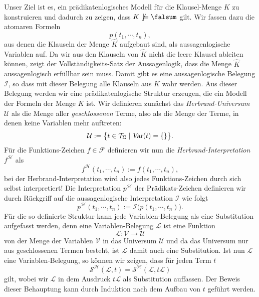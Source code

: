 Unser Ziel ist es, ein pr\"{a}dikatenlogisches Modell f\"{u}r die Klausel-Menge $K$ zu konstruieren und
dadurch zu zeigen, dass $K \not\,\models \falsum$ gilt.
Wir fassen dazu die atomaren Formeln
\[ p(t_1,\cdots,t_n), \]
aus denen die Klauseln der Menge $\widehat{K}$ aufgebaut sind, als aussagenlogische Variablen auf.
Da wir aus den Klauseln von $\widehat{K}$ nicht die leere Klausel ableiten k\"{o}nnen, zeigt der
Vollst\"{a}ndigkeits-Satz der Aussagenlogik, dass die Menge $\widehat{K}$ aussagenlogisch erf\"{u}llbar 
sein muss.  Damit gibt es eine aussagenlogische Belegung $\mathcal{I}$, so dass mit dieser Belegung
alle Klauseln aus $K$ wahr werden.  Aus dieser Belegung werden wir eine pr\"{a}dikatenlogische Struktur
erzeugen, die ein Modell der Formeln der Menge $K$ ist.  Wir definieren zun\"{a}chst das
\emph{Herbrand-Universum} $\mathcal{U}$ als die Menge aller \emph{geschlossenen} Terme,
also als die Menge der Terme, in denen keine Variablen mehr auftreten:
\[ \mathcal{U} := \bigl\{ t \in \mathcal{T}_\Sigma \mid \textsl{Var}(t) = \{\} \bigr\}. \]
F\"{u}r die Funktions-Zeichen $f \in \mathcal{F}$ definieren wir nun die \emph{Herbrand-Interpretation}
$f^\mathcal{H}$ als
\[ f^\mathcal{H}(t_1, \cdots, t_n) := f(t_1,\cdots,t_n), \]
bei der Herbrand-Interpretation wird also jedes Funktions-Zeichen durch sich selbst interpretiert!
Die Interpretation $p^\mathcal{H}$ der Pr\"{a}dikats-Zeichen definieren wir durch R\"{u}ckgriff auf die
aussagenlogische Interpretation $\mathcal{I}$ wie folgt
\[ 
  p^\mathcal{H}(t_1,\cdots,t_n) := \mathcal{I}\bigl(p(t_1,\cdots,t_n)\bigr).
\]
F\"{u}r die so definierte Struktur kann jede Variablen-Belegung als eine Substitution
aufgefasst werden, denn eine Variablen-Belegung $\mathcal{L}$ ist eine Funktion
\[ \mathcal{L}: \mathcal{V} \rightarrow \mathcal{U} \]
von der Menge der Variablen $\mathcal{V}$ in das Universum $\mathcal{U}$ und da das
Universum nur aus geschlossenen Termen besteht, ist $\mathcal{L}$ damit auch eine
Substitution.  Ist nun $\mathcal{L}$ eine Variablen-Belegung, so k\"{o}nnen wir zeigen, dass f\"{u}r jeden
Term $t$ 
\[ \mathcal{S}^\mathcal{H}(\mathcal{L}, t) = \mathcal{S}^\mathcal{H}(\mathcal{L},t\mathcal{L})  \]
gilt, wobei wir $\mathcal{L}$ in dem Ausdruck $t\mathcal{L}$ als Substitution auffassen.  
Der Beweis dieser Behauptung kann durch Induktion nach dem Aufbau von $t$ gef\"{u}hrt werden.

